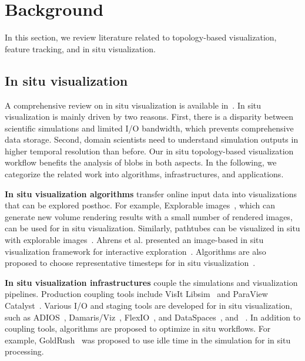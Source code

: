 \section{Background}
\label{sec:related}

In this section, we review literature related to topology-based visualization, feature tracking, and in situ visualization.  


\subsection{In situ visualization}

A comprehensive review on in situ visualization is available in~\cite{BauerAACGKMLVWB16}.  In situ visualization is mainly driven by two reasons.  First, there is a disparity between scientific simulations and limited I/O bandwidth, which prevents comprehensive data storage.  Second, domain scientists need to understand simulation outputs in higher temporal resolution than before.  Our in situ topology-based visualization workflow benefits the analysis of blobs in both aspects.  In the following, we categorize the related work into algorithms, infrastructures, and applications.  

{\bf In situ visualization algorithms} transfer online input data into visualizations that can be explored posthoc.  For example, Explorable images~\cite{TikhonovaCM2010}, which can generate new volume rendering results with a small number of rendered images, can be used for in situ visualization.  Similarly, pathtubes can be visualized in situ with explorable images~\cite{YeMM13}.  Ahrens et al. presented an image-based in situ visualization framework for interactive exploration~\cite{AhrensJOPRP14}.  Algorithms are also proposed to choose representative timesteps for in situ visualization~\cite{MalakarVMKHLP15}.  

{\bf In situ visualization infrastructures} couple the simulations and visualization pipelines.  Production coupling tools include VisIt Libsim~\cite{WhitlockFM11} and ParaView Catalyst~\cite{FabianMTBMGRJ11}.  
Various I/O and staging tools are developed for in situ visualization, such as ADIOS~\cite{LofsteadZKS09}, Damaris/Viz~\cite{DorierSPAS13}, FlexIO~\cite{ZhengZESWDNCAKPY13}, and DataSpaces~\cite{DocanPK12}, and ~\cite{}.  
In addition to coupling tools, algorithms are proposed to optimize in situ workflows.  For example, GoldRush~\cite{ZhengYHWESAK13} was proposed to use idle time in the simulation for in situ processing.  


